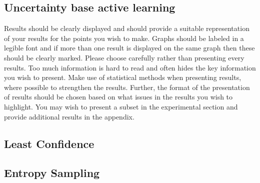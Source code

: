 \subsection{Uncertainty base active learning}

Results should be clearly displayed and should provide a suitable representation of your results for the points you wish to make. Graphs should be labeled in a legible font and if more than one result is displayed on the same graph then these should be clearly marked.   Please choose carefully rather than presenting every results. Too much information is hard to read and often hides the key information you wish to present. Make use of statistical methods when presenting results, where possible to strengthen the results.  Further, the format of the presentation of results should be chosen based on what issues in the results you wish to highlight. You may wish to present a subset in the experimental section and provide additional results in the appendix.
\subsection{Least Confidence }
\subsection{Entropy Sampling}